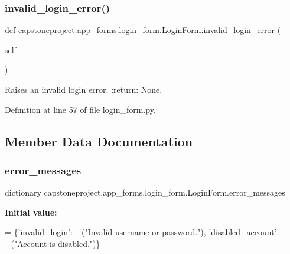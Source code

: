 \subsubsection{\texorpdfstring{invalid\+\_\+login\+\_\+error()}{invalid\_login\_error()}}
{\footnotesize\ttfamily def capstoneproject.\+app\+\_\+forms.\+login\+\_\+form.\+Login\+Form.\+invalid\+\_\+login\+\_\+error (\begin{DoxyParamCaption}\item[{}]{self }\end{DoxyParamCaption})}

\begin{DoxyVerb}Raises an invalid login error.
:return: None.
\end{DoxyVerb}
 

Definition at line 57 of file login\+\_\+form.\+py.



\subsection{Member Data Documentation}
\mbox{\label{classcapstoneproject_1_1app__forms_1_1login__form_1_1_login_form_a44e977c3d2790e574b58fd0d117a74ec}} 
\subsubsection{\texorpdfstring{error\+\_\+messages}{error\_messages}}
{\footnotesize\ttfamily dictionary capstoneproject.\+app\+\_\+forms.\+login\+\_\+form.\+Login\+Form.\+error\+\_\+messages\hspace{0.3cm}{\ttfamily [static]}}

{\bfseries Initial value\+:}
\begin{DoxyCode}
=  \{\textcolor{stringliteral}{'invalid\_login'}: \_(\textcolor{stringliteral}{"Invalid username or password."}),
                      \textcolor{stringliteral}{'disabled\_account'}: \_(\textcolor{stringliteral}{"Account is disabled."})\}
\end{DoxyCode}


